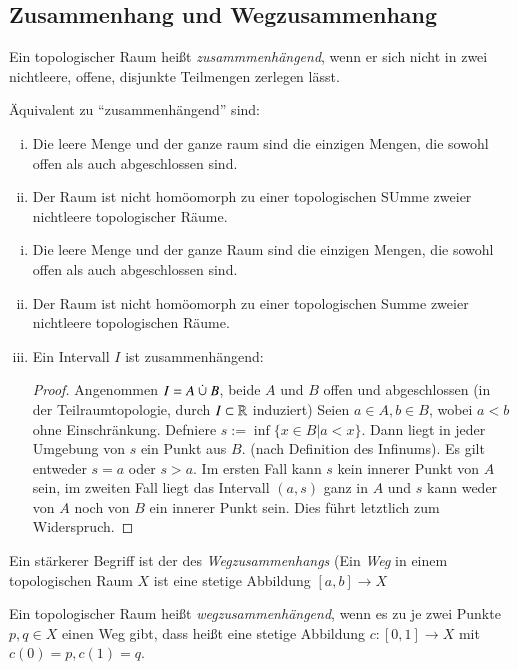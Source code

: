 \documentclass[a4paper,10pt]{scrartcl}
\begin{document}
\subsection{Zusammenhang und Wegzusammenhang}
\begin{df}
Ein topologischer Raum heißt \emph{zusammmenhängend}, wenn er sich nicht in zwei nichtleere, offene, disjunkte Teilmengen zerlegen lässt.
\end{df}
\fixme[fig19]
\begin{note*}
Äquivalent zu "`zusammenhängend"' sind:
\begin{enumerate}[(i)]
\item Die leere Menge und der ganze raum sind die einzigen Mengen, die sowohl offen als auch abgeschlossen sind.
\item Der Raum ist nicht homöomorph zu einer topologischen SUmme zweier nichtleere topologischer Räume.
\end{enumerate}
\end{note*}
\begin{exs*}
\begin{enumerate}[(i)]
\item Die leere Menge und der ganze Raum sind die einzigen Mengen, die sowohl offen als auch abgeschlossen sind.
\item Der Raum ist nicht homöomorph zu einer topologischen Summe zweier nichtleere topologischen Räume.
\item Ein Intervall $ I $ ist zusammenhängend: 
\begin{proof}
Angenommen $I=A\mathbin{\dot{\cup}} B$, beide $ A $ und $ B $ offen und abgeschlossen (in der Teilraumtopologie, durch $ I\subset \mathbb{R} $ induziert) Seien $ a\in A, b\in B $, wobei $ a<b $ ohne Einschränkung. Defniere $ s:=\inf\{x\in B|a<x\}$. Dann liegt in jeder Umgebung von $ s $ ein Punkt aus $ B $. (nach Definition des Infinums). Es gilt entweder $ s=a $ oder $ s>a $. Im ersten Fall kann $ s $ kein innerer Punkt von $ A $ sein, im zweiten Fall liegt das Intervall $ (a,s) $ ganz in $ A $ und $ s $ kann weder von $ A $ noch von $ B $ ein innerer Punkt sein. Dies führt letztlich zum Widerspruch.
\end{proof}
\end{enumerate}
\end{exs*}
Ein stärkerer Begriff ist der des \emph{Wegzusammenhangs} (Ein \emph{Weg} in einem topologischen Raum $ X $ ist eine stetige Abbildung $ [a,b]\to X $
\begin{df}
Ein topologischer Raum heißt \emph{wegzusammenhängend}, wenn es zu je zwei Punkte $ p,q\in X $ einen Weg gibt, dass heißt eine stetige Abbildung $ c: [0,1]\to X $ mit $c(0)=p, c(1)=q$.
\end{df}
\end{document}
